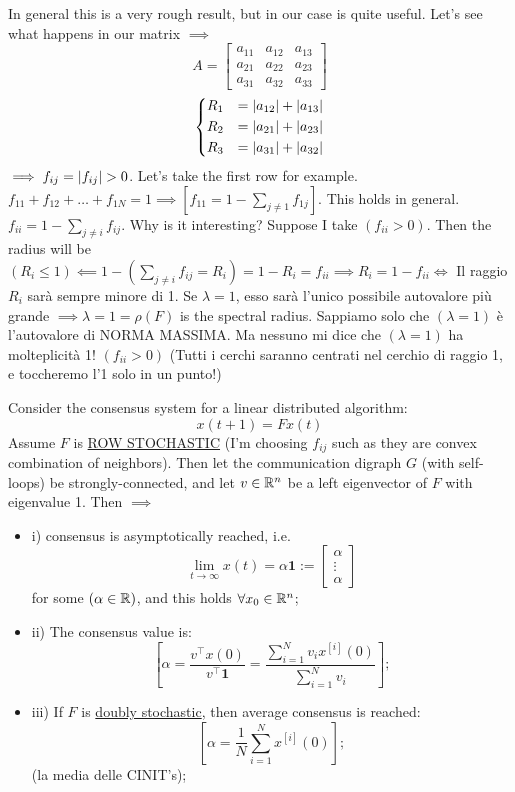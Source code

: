 In general this is a very rough result, but in our case is quite useful. Let's see what happens in our matrix $\implies$
\[
	A=\begin{bmatrix}a_{11}&a_{12}&a_{13}\\a_{21}&a_{22}&a_{23}\\a_{31}&a_{32}&a_{33}\end{bmatrix}
\]
\[
	\left\{
	\begin{aligned}
	&R_1 &= \lvert a_{12}\rvert+\lvert a_{13}\rvert \\
	&R_2 &= \lvert a_{21}\rvert+\lvert a_{23}\rvert \\
	&R_3 &= \lvert a_{31}\rvert+\lvert a_{32}\rvert
	\end{aligned} 
	\right.
\]
$\implies f_{ij} = \lvert f_{ij}\rvert>0$. Let's take the first row for example. $f_{11} + f_{12} + \dots + f_{1N} = 1 \implies [f_{11} = 1-\sum_{j\neq 1}{f_{1j}}]$. This holds in general. 
$f_{ii} = 1-\sum_{j\neq i}{f_{ij}}$. Why is it interesting? Suppose I take $(f_{ii}>0)$. Then the radius will be $(R_i \leq 1) \impliedby 1-(\sum_{j\neq i}{f_{ij}}=R_i) = 1-R_i = f_{ii} \implies R_i=1-f_{ii} \iff$ Il raggio $R_i$ sarà sempre minore di 1. Se $\lambda=1$, esso sarà l'unico possibile autovalore più grande $\implies \lambda=1=\rho(F)$ is the spectral radius. Sappiamo solo che $(\lambda=1)$ è l'autovalore di NORMA MASSIMA. Ma nessuno mi dice che $(\lambda=1)$ ha molteplicità 1! $(f_{ii}>0)$ (Tutti i cerchi saranno centrati nel cerchio di raggio 1, e toccheremo l'1 solo in un punto!)

\begin{thrm}
Consider the consensus system for a linear distributed algorithm:
\[
	x(t+1)=Fx(t)
\]
Assume $F$ is \underline{ROW STOCHASTIC} (I'm choosing $f_{ij}$ such as they are convex combination of neighbors). Then let the communication digraph $G$ (with self-loops) be strongly-connected, and let $v\in\mathbb{R}^n$ be a left eigenvector of $F$ with eigenvalue 1. Then $\implies$
\begin{itemize}
\item{i)} consensus is asymptotically reached, i.e.
\[
	\lim_{t\to\infty}{x(t)}=\alpha\mathbf{1} := \begin{bmatrix}\alpha\\ \vdots\\ \alpha\end{bmatrix}
\]
for some $(\alpha\in\mathbb{R})$, and this holds $\forall x_0 \in \mathbb{R}^n$;
\item{ii)} The consensus value is:
\[
	[\alpha = \frac{v^\top x(0)}{v^\top \mathbf{1}} = \frac{\sum_{i=1}^N{v_ix^{[i]}(0)}}{\sum_{i=1}^N{v_i}}];
\]
\item{iii)} If $F$ is \underline{doubly stochastic}, then average consensus is reached:
\[
	[\alpha=\frac{1}{N}\sum_{i=1}^N{x^{[i]}(0)}];
\]
(la media delle CINIT's);
\end{itemize}
\end{thrm}

